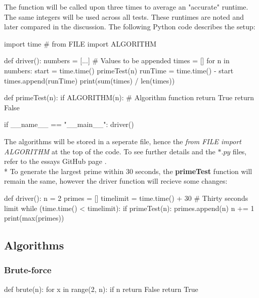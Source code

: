 \documentclass[main.tex]{subfiles}
\begin{document}
\vspace{10mm}

The function will be called upon three times to average an "accurate" runtime. The same integers will be used across all tests. These runtimes are noted and later compared in the discussion. The following Python code describes the setup:

\begin{python}
    import time
    # from FILE import ALGORITHM

    def driver():
        numbers = [...] # Values to be appended
        times = []
        for n in numbers:
            start = time.time()
            primeTest(n)
            runTime = time.time() - start
            times.append(runTime)
        print(sum(times) / len(times))

    def primeTest(n):
        if ALGORITHM(n): # Algorithm function
            return True
        return False

    if __name__ == "__main__":
        driver()
\end{python}

The algorithms will be stored in a seperate file, hence the \textit{from FILE import ALGORITHM} at the top of the code. To see further details and the $*.py$ files, refer to the essays GitHub page \cite{github}.
\newline
\\*
To generate the largest prime within $30$ seconds, the \textbf{primeTest} function will remain the same, however the driver function will recieve some changes:

\begin{python}
    def driver():
        n = 2
        primes = []
        timelimit = time.time() + 30  # Thirty seconds limit
        while (time.time() < timelimit):
            if primeTest(n):
                primes.append(n)
            n += 1
        print(max(primes))
\end{python}

\subsection{Algorithms}

\subsubsection{Brute-force}

\begin{python}
    def brute(n):
        for x in range(2, n):
            if n %
                return False
        return True
\end{python}
\end{document}
